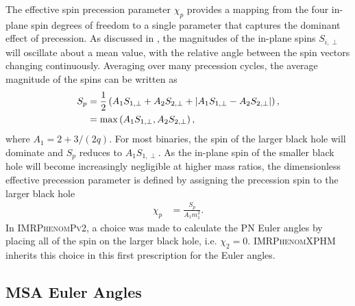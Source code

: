 \documentclass[%
aps,
prd,
amssymb,
amsmath,
amsfonts,
eqsecnum,
showpacs,
nofootinbib,
floatfix,
twocolumn,
twoside,
a4paper,
superscriptaddress
]{revtex4-1}
\newcommand{\ppvtwo}{\textsc{IMRPhenomPv2}\xspace}
\newcommand{\phXPHM}{\textsc{IMRPhenomXPHM}\xspace}
\begin{document}
The effective spin precession parameter $\chi_p$ \cite{Schmidt:2014iyl} provides a mapping from the four in-plane spin degrees of freedom to a single parameter that captures the dominant effect of precession. As discussed in \cite{Schmidt:2014iyl}, the magnitudes of the in-plane spins $S_{i,\perp}$ will oscillate about a mean value, with the relative angle between the spin vectors changing continuously. Averaging over many precession cycles, the average magnitude of the spins can be written as \cite{Schmidt:2014iyl}
\begin{align}\label{eq:avNNLOSperp}
    S_p &= \frac{1}{2} \left( A_1 S_{1,\perp} + A_2 S_{2,\perp} + | A_{1} S_{1,\perp} - A_2 S_{2,\perp} |\right) , \\
    &= {\rm{max}} \left( A_1 S_{1,\perp} , A_2 S_{2,\perp} \right),
\end{align}
where $A_1 = 2 + 3 / (2 q)$.
For most binaries, the spin of the larger black hole will dominate and $S_p$ reduces to $A_1 S_{1,\perp}$. As the in-plane spin of the smaller black hole will become  increasingly negligible at higher mass ratios, the dimensionless effective precession parameter is defined by assigning the precession spin to the larger black hole \cite{Schmidt:2014iyl}
\begin{align}\label{def:chip}
    \chi_p &= \frac{S_p}{A_1 m^2_1} .
\end{align}
\newline 
In \ppvtwo, a choice was made to calculate the PN Euler angles by placing all of the spin on the larger black hole, i.e. $\chi_2 = 0$.
\phXPHM inherits this choice in this first prescription for the Euler angles.



\subsection{MSA Euler Angles}
\label{sec:double_spin_angles}
\end{document}
